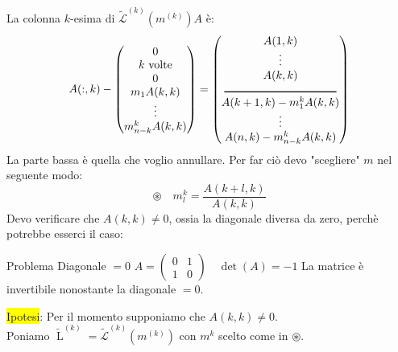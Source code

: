 \documentclass{article}
\begin{document}
La colonna $k$-esima di $\widetilde{\mathcal{L}}^{(k)}\left(m^{(k)}\right)A$ è:
\[A(:,k)-\begin{pmatrix}
        0              \\
        k\text{ volte} \\
        0              \\
        m_1A(k,k)      \\
        \vdots         \\
        m_{n-k}^kA(k,k)
    \end{pmatrix}=\begin{pmatrix}
        A(1,k)                     \\
        \vdots                     \\
        A(k,k)                     \\
        \noindent\rule{3.5cm}{1pt} \\
        A(k+1,k)-m^k_1A(k,k)       \\
        \vdots                     \\
        A(n,k)-m^k_{n-k}A(k,k)
    \end{pmatrix}\]
La parte bassa è quella che voglio annullare. Per far ciò devo "scegliere" $m$ nel seguente modo:
\[\circledast\quad m^k_l=\frac{A(k+l,k)}{A(k,k)}\]
Devo verificare che $A(k,k)\ne0$, ossia la diagonale diversa da zero, perchè potrebbe esserci il caso:
\begin{ex}{Problema Diagonale $=0$}{}
    $A=\begin{pmatrix}
            0 & 1 \\
            1 & 0
        \end{pmatrix}\quad \operatorname{det}(A)=-1$ La matrice è invertibile nonostante la diagonale $=0$.
\end{ex}

\colorbox{yellow}{Ipotesi}:
Per il momento supponiamo che $A(k,k)\ne0$.\\
Poniamo $\widetilde{\operatorname{L}}^{(k)}=\widetilde{\mathcal{L}}^{(k)}\left(m^{(k)}\right)$ con $m^k$
scelto come in $\circledast$.
\end{document}
